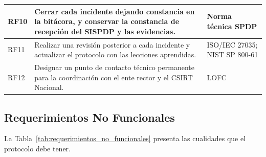 \begin{table}[htbp]
\begin{tabular}{|L{\tabcolsep}|L{\tabcolsep}|L{\tabcolsep}|}
    \hline
    RF10 & Cerrar cada incidente dejando constancia en la bitácora, y conservar la constancia de recepción del SISPDP y las evidencias. & Norma técnica SPDP \\
    \hline
    RF11 & Realizar una revisión posterior a cada incidente y actualizar el protocolo con las lecciones aprendidas. & ISO/IEC 27035; NIST SP 800-61 \\
    \hline
    RF12 & Designar un punto de contacto técnico permanente para la coordinación con el ente rector y el CSIRT Nacional. & LOFC \\
    \hline
  \end{tabular}
  \par\normalsize\raggedright
\end{table}

\subsection{Requerimientos No Funcionales}
La Tabla~\ref{tab:requerimientos_no_funcionales} presenta las cualidades que el protocolo debe tener.

